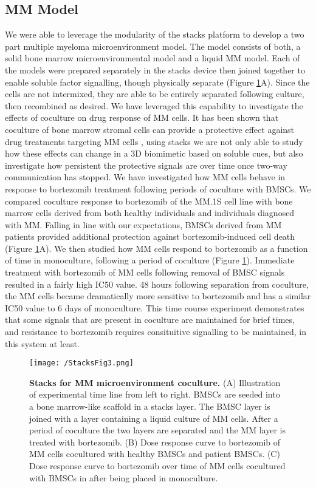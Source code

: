 \subsection{MM Model}
We were able to leverage the modularity of the stacks platform to develop a two part multiple myeloma microenvironment model. The model consists of both, a solid bone marrow microenvironmental model and a liquid MM model. Each of the models were prepared separately in the stacks device then joined together to enable soluble factor signalling, though physically separate (Figure \ref{figure:StacksFig3}A). Since the cells are not intermixed, they are able to be entirely separated following culture, then recombined as desired. We have leveraged this capability to investigate the effects of coculture on drug response of MM cells. It has been shown that coculture of bone marrow stromal cells can provide a protective effect against drug treatments targeting MM cells \cite{Abdi2013}, using stacks we are not only able to study how these effects can change in a 3D biomimetic based on soluble cues, but also investigate how persistent the protective signals are over time once two-way communication has stopped. We have investigated how MM cells behave in response to bortezomib treatment following periods of coculture with BMSCs. We compared coculture response to bortezomib of the MM.1S cell line with bone marrow cells derived from both healthy individuals and individuals diagnosed with MM. Falling in line with our expectations, BMSCs derived from MM patients provided additional protection against bortezomib-induced cell death (Figure \ref{figure:StacksFig3}A). We then studied how MM cells respond to bortezomib as a function of time in monoculture, following a period of coculture (Figure \ref{figure:StacksFig3}). Immediate treatment with bortezomib of MM cells following removal of BMSC signals resulted in a fairly high IC50 value. 48 hours following separation from coculture, the MM cells became dramatically more sensitive to bortezomib and has a similar IC50 value to 6 days of monoculture. This time course experiment demonstrates that some signals that are present in coculture are maintained for brief times, and resistance to bortezomib requires consituitive signalling to be maintained, in this system at least. 

\begin{figure}[h!] %
\centering
\texttt{[image: /StacksFig3.png]}
\caption[\textbf{Stacks for MM microenvironment coculture}]{\textbf{Stacks for MM microenvironment coculture.} (A) Illustration of experimental time line from left to right. BMSCs are seeded into a bone marrow-like scaffold in a stacks layer. The BMSC layer is joined with a layer containing a liquid culture of MM cells. After a period of coculture the two layers are separated and the MM layer is treated with bortezomib. (B) Dose response curve to bortezomib of MM cells cocultured with healthy BMSCs and patient BMSCs. (C) Dose response curve to bortezomib over time of MM cells cocultured with BMSCs in after being placed in monoculture.}
\label{figure:StacksFig3}
\end{figure}


